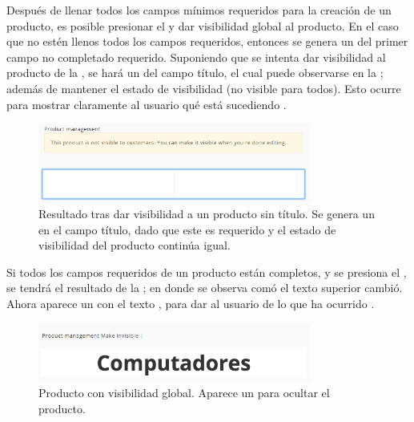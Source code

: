 		Después de llenar todos los campos mínimos requeridos para la creación de un producto, es posible presionar el \linkINT \youCanMakeItVisibleLABEL y dar visibilidad global al producto. En el caso que no estén llenos todos los campos requeridos, entonces se genera un \autoFocoINT del primer campo no completado requerido. Suponiendo que se intenta dar visibilidad al producto de la , se hará un \autoFocoINT del campo título, el cual puede observarse en la ; además de mantener el estado de visibilidad (no visible para todos). Esto ocurre para mostrar claramente al usuario qué está sucediendo \cite{online_google_ui_pattern_error, online_goodgui_org}.

		\begin{figure}[H]
			\centering
			\includegraphics[width=0.8\textwidth]{figuras/solution/product/visibility/autofocus.png}

			\caption{Resultado tras dar visibilidad a un producto sin título. Se genera un \autoFocoINT en el campo título, dado que este es requerido y el estado de visibilidad del producto continúa igual.}
			\label{figure:solution:product:visibility:autofocus}
		\end{figure}

		Si todos los campos requeridos de un producto están completos, y se presiona el \linkINT \youCanMakeItVisibleLABEL, se tendrá el resultado de la ; en donde se observa comó el texto superior cambió. Ahora aparece un \linkINT con el texto \makeInvisibleLABEL, para dar \feedback al usuario de lo que ha ocurrido \cite{online_google_ui_design_material, online_goodgui_org}.

		\begin{figure}[H]
			\centering
			\includegraphics[width=0.8\textwidth]{figuras/solution/product/visibility/global_visibility.png}

			\caption{Producto con visibilidad global. Aparece un \linkINT \makeInvisibleLABEL para ocultar el producto.}
			\label{figure:solution:product:visibility:global_visibility}
		\end{figure}

